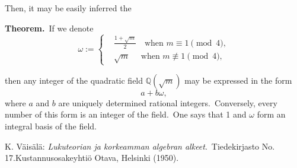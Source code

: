\documentclass[12pt]{article}
\theoremstyle{definition}
\begin{document}
Then, it may be easily inferred the 

\textbf{Theorem.}\, If we denote
\[ 
\omega := 
\begin{cases}
& \frac{1+\sqrt{m}}{2} \quad \mbox{when  } m \equiv 1\pmod{4},\\
& \sqrt{m} \quad \mbox{   when  } m \not\equiv 1\pmod{4},
\end{cases}
\]

then any integer of the quadratic field $\mathbb{Q}(\sqrt{m})$ 
may be expressed in the form
$$a\!+\!b\omega,$$
where $a$ and $b$ are uniquely determined rational integers.\, 
Conversely, every number of this form is an integer of the field.\, One says that 1 and $\omega$ form an integral basis of the field.

\begin{thebibliography}{9}
 {\sc K. V\"ais\"al\"a}: {\em Lukuteorian ja korkeamman algebran alkeet}.\, Tiedekirjasto No. 17.\quad  Kustannusosakeyhti\"o Otava, Helsinki (1950).
\end{thebibliography}\\


\end{document}
